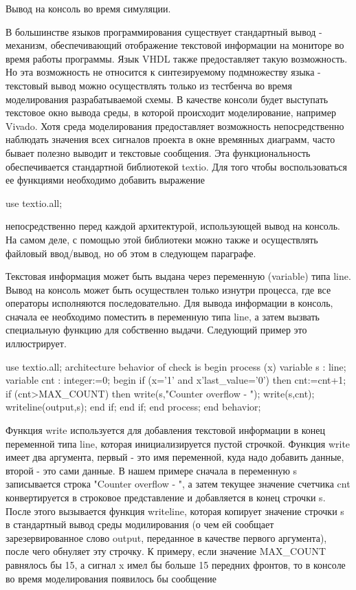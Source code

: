 
Вывод на консоль во время симуляции. 

В большинстве языков программирования существует стандартный вывод - механизм, обеспечивающий отображение текстовой информации на мониторе во время работы программы. Язык VHDL также предоставляет такую возможность. Но эта возможность не относится к синтезируемому подмножеству языка - текстовый вывод можно осуществлять только из тестбенча во время моделирования разрабатываемой схемы. В качестве консоли будет выступать текстовое окно вывода среды, в которой происходит моделирование, например Vivado. Хотя среда моделирования предоставляет возможность непосредственно наблюдать значения всех сигналов проекта в окне времянных диаграмм, часто бывает полезно выводит и текстовые сообщения. Эта функциональность обеспечивается стандартной библиотекой textio. Для того чтобы воспользоваться ее функциями необходимо добавить выражение

use textio.all;

непосредственно перед каждой архитектурой, использующей вывод на консоль. На самом деле, с помощью этой библиотеки можно также и осуществлять файловый ввод/вывод, но об этом в следующем параграфе. 

Текстовая информация может быть выдана через переменную (variable) типа line. Вывод на консоль может быть осуществлен только изнутри процесса, где все операторы исполняются последовательно. Для вывода информации в консоль, сначала ее необходимо поместить в переменную типа line, а затем вызвать специальную функцию для собственно выдачи. Следующий пример это иллюстрирует.

use textio.all;
architecture behavior of check is
begin
  process (x)
    variable s : line;
    variable cnt : integer:=0;
  begin
    if (x='1' and x'last_value='0') then
      cnt:=cnt+1;
      if (cnt>MAX_COUNT) then
        write(s,"Counter overflow - ");
        write(s,cnt);
        writeline(output,s);
      end if;
    end if;
  end process;
end behavior;


Функция write используется для добавления текстовой информации в конец переменной типа line, которая инициализируется пустой строчкой. Функция write имеет два аргумента, первый - это имя переменной, куда надо добавить данные, второй - это сами данные. В нашем примере сначала в переменную s записывается строка "Counter overflow - ", а затем текущее значение счетчика cnt конвертируется в строковое представление и добавляется в конец строчки s. После этого вызывается функция writeline, которая копирует значение строчки s в стандартный вывод среды модилирования (о чем ей сообщает зарезервированное слово output, переданное в качестве первого аргумента), после чего обнуляет эту строчку. К примеру, если значение MAX_COUNT равнялось бы 15, а сигнал x имел бы больше 15 передних фронтов, то в консоле во время моделирования появилось бы сообщение 

